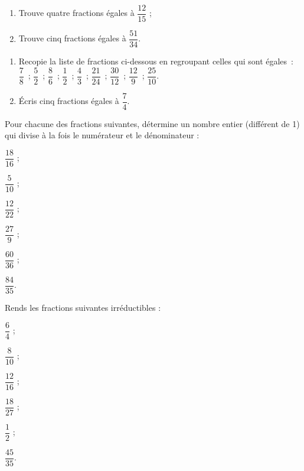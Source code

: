 \begin{exercice}
\begin{enumerate}
 \item Trouve quatre fractions égales à $\dfrac{12}{15}$ ;
 \item Trouve cinq fractions égales à $\dfrac{51}{34}$.
 \end{enumerate}
\end{exercice}


\begin{exercice}
\begin{enumerate}
 \item Recopie la liste de fractions ci-dessous en regroupant celles qui sont égales : \\[0.5em]
$\dfrac{7}{8}$ ; $\dfrac{5}{2}$ ; $\dfrac{8}{6}$ ; $\dfrac{1}{2}$ ; $\dfrac{4}{3}$ ; $\dfrac{21}{24}$ ; $\dfrac{30}{12}$ ; $\dfrac{12}{9}$ ; $\dfrac{25}{10}$.
\vspace{0.2cm}
 \item Écris cinq fractions égales à $\dfrac{7}{4}$.
 \end{enumerate}
\end{exercice}


\begin{exercice}
Pour chacune des fractions suivantes, détermine un nombre entier (différent de 1) qui divise à la fois le numérateur et le dénominateur : \\[0.5em]
\begin{colenumerate}{3}
 \item $\dfrac{18}{16}$ ; 
 \vspace{0.2cm}
 \item $\dfrac{5}{10}$ ; 
 \item $\dfrac{12}{22}$ ; 
 \item $\dfrac{27}{9}$ ; 
 \item $\dfrac{60}{36}$ ; 
 \item $\dfrac{84}{35}$.
 \end{colenumerate}
\end{exercice}


\begin{exercice}
Rends les fractions suivantes irréductibles : \\[0.5em]
\begin{colenumerate}{3}
 \item $\dfrac{6}{4}$ ; 
 \vspace{0.2cm}
 \item $\dfrac{8}{10}$ ; 
 \item $\dfrac{12}{16}$ ; 
 \item $\dfrac{18}{27}$ ; 
 \item $\dfrac{1}{2}$ ; 
 \item $\dfrac{45}{35}$.
 \end{colenumerate}
 \end{exercice}


